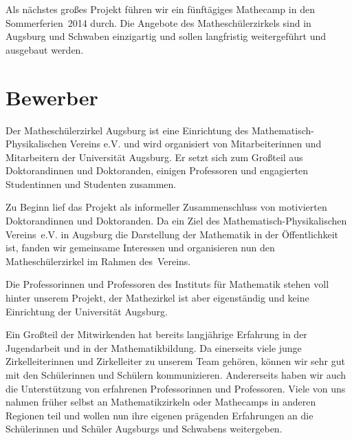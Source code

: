 \documentclass[12pt]{zettel}
\begin{document}
Als nächstes großes Projekt führen wir ein fünftägiges Mathecamp in den
Sommerferien~2014 durch. Die Angebote des Matheschülerzirkels sind in Augsburg
und Schwaben einzigartig und sollen langfristig weitergeführt und ausgebaut
werden.

\section{Bewerber}

Der Matheschülerzirkel Augsburg ist eine Einrichtung des
Mathematisch-Phy\-si\-ka\-li\-schen Vereins e.V. und wird organisiert von
Mitarbeiterinnen und Mitarbeitern der Universität
Augsburg. Er setzt sich zum Großteil aus Doktorandinnen und Doktoranden,
einigen Professoren und engagierten Studentinnen und Studenten zusammen.

Zu Beginn lief das Projekt als informeller Zusammenschluss von motivierten Doktorandinnen und Doktoranden. Da ein Ziel des Mathematisch-Physikalischen Vereins~e.V. in Augsburg die Darstellung der Mathematik in der Öffentlichkeit ist, fanden wir gemeinsame Interessen und organisieren nun den Matheschülerzirkel im Rahmen des~Vereins.

Die Professorinnen und Professoren des Instituts für Mathematik stehen voll hinter unserem Projekt, der Mathezirkel ist aber eigenständig und keine Einrichtung der Universität Augsburg.

Ein Großteil der Mitwirkenden hat bereits langjährige Erfahrung in
der Jugendarbeit und in der Mathematikbildung. Da einerseits viele junge Zirkelleiterinnen und Zirkelleiter zu unserem Team gehören, können wir
sehr gut mit den Schülerinnen und Schülern kommunizieren.
Andererseits haben wir auch die Unterstützung von erfahrenen Professorinnen und Professoren. Viele von uns nahmen früher selbst an Mathematikzirkeln oder Mathecamps in anderen Regionen teil und wollen nun ihre eigenen prägenden Erfahrungen an die Schülerinnen und Schüler Augsburgs und Schwabens weitergeben.
\end{document}
